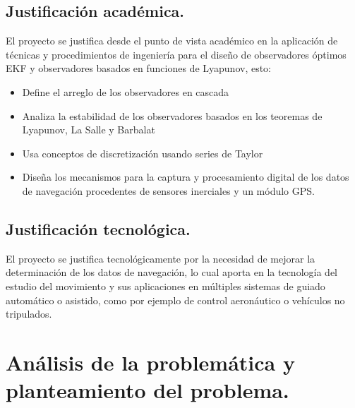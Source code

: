 \documentclass[10pt]{report}
\numberwithin{equation}{chapter}
\numberwithin{algorithm}{chapter}
\begin{document}
\subsection{Justificación académica.}
El proyecto se justifica desde el punto de vista académico en la aplicación de técnicas y procedimientos de ingeniería para el diseño de observadores óptimos EKF y observadores basados en funciones de Lyapunov, esto: 
\begin{itemize}
\item Define el arreglo de los observadores en cascada
\item Analiza la estabilidad de los observadores basados en los teoremas de Lyapunov, La Salle y Barbalat
\item Usa conceptos de discretización usando series de Taylor
\item Diseña los mecanismos para la captura y procesamiento digital de los datos de navegación procedentes de sensores inerciales y un módulo GPS.
\end{itemize}
\subsection{Justificación tecnológica.}
El proyecto se justifica tecnológicamente por la necesidad de mejorar la determinación de los datos de navegación, lo cual aporta en la tecnología del estudio del movimiento y sus aplicaciones en múltiples sistemas de guiado automático o asistido, como por ejemplo de control aeronáutico o vehículos no tripulados.
\section{Análisis de la problemática y planteamiento del problema.}
\end{document}
